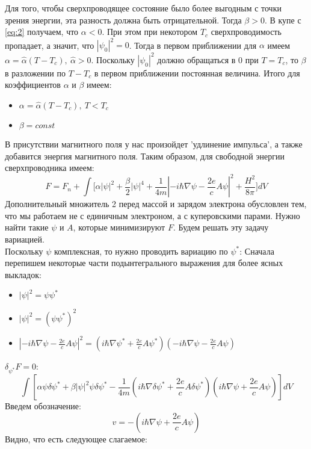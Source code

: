\documentclass[a4paper]{article}
\begin{document}
Для того, чтобы сверхпроводящее состояние было более выгодным с точки зрения энергии, эта разность должна быть отрицательной. Тогда $\beta>0$. В купе с \ref{eq:2} получаем, что $\alpha<0$. При этом при некотором $T_c$ сверхпроводимость пропадает, а значит, что $|\psi_0|^2=0$. Тогда в первом приближении для $\alpha$ имеем $\alpha=\hat\alpha(T-T_c),~\hat\alpha>0$. Поскольку $|\psi_0|^2$ должно обращаться в 0 при $T=T_c$, то $\beta$ в разложении по $T-T_c$ в первом приближении постоянная величина. Итого для коэффициентов $\alpha$ и $\beta$ имеем:
\begin{itemize}
    \item $\alpha=\hat\alpha(T-T_c),~T<T_c $
    \item $\beta=const$
\end{itemize}
В присутствии магнитного поля у нас произойдет 'удлинение импульса', а также добавится энергия магнитного поля. Таким образом, для свободной энергии сверхпроводника имеем:
\begin{equation} \label{eq:4}
F=F_n+\int{[\alpha|\psi|^2+\frac{\beta}{2}|\psi|^4+\frac{1}{4m}|-i\hbar\nabla\psi-\frac{2e}{c}A\psi|^2+\frac{H^2}{8\pi}}]dV
\end{equation}
Дополнительный множитель 2 перед массой и зарядом электрона обусловлен тем, что мы работаем не с единичным электроном, а с куперовскими парами.
\newpage
Нужно найти такие $\psi$ и $A$, которые минимизируют $F$. Будем решать эту задачу вариацией.\\
Поскольку $\psi$ комплексная, то нужно проводить вариацию по $\psi^*$:
Сначала перепишем некоторые части подынтегрального выражения для более ясных выкладок:
\begin{itemize}
    \item $|\psi|^2=\psi\psi^*$
    \item $|\psi|^2=(\psi\psi^*)^2$
    \item $|-i\hbar\nabla\psi-\frac{2e}{c}A\psi|^2=(i\hbar\nabla\psi^*+\frac{2e}{c}A\psi^*)(-i\hbar\nabla\psi-\frac{2e}{c}A\psi)$
\end{itemize}
$\delta_{\psi^*}F=0$:
\begin{equation} \label{eq:5}
\int[\alpha\psi\delta\psi^*+\beta|\psi|^2\psi\delta\psi^*-\frac{1}{4m}(i\hbar\nabla\delta\psi^*+\frac{2e}{c}A\delta\psi^*)(i\hbar\nabla\psi+\frac{2e}{c}A\psi)]dV
\end{equation}
Введем обозначение:
\begin{equation} \label{eq:6}
v=-(i\hbar\nabla\psi+\frac{2e}{c}A\psi)
\end{equation}
Видно, что есть следующее слагаемое:
\end{document}
